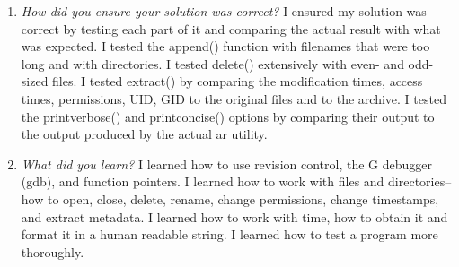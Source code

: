 \documentclass[letterpaper,10pt,titlepage]{article}
\begin{document}
\begin{enumerate}
\begin{enumerate}
	\item \emph{How did you ensure your solution was correct?}
I ensured my solution was correct by testing each part of it and comparing the actual result with what was expected. I tested the append() function with filenames that were too long and with directories. I tested delete() extensively with even- and odd-sized files. I tested extract() by comparing the modification times, access times, permissions, UID, GID to the original files and to the archive. I tested the printverbose() and printconcise() options by comparing their output to the output produced by the actual ar utility.

	\item \emph{What did you learn?}
I learned how to use revision control, the G debugger (gdb), and function pointers. I learned how to work with files and directories--how to open, close, delete, rename, change permissions, change timestamps, and extract metadata. I learned how to work with time, how to obtain it and format it in a human readable string. I learned how to test a program more thoroughly.
	\end{enumerate}
\end{enumerate}

%
\end{document}
